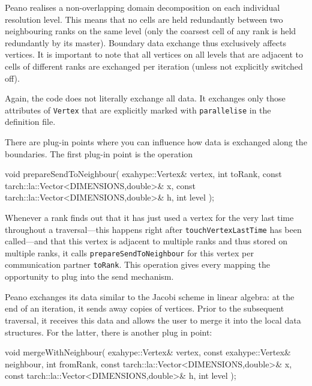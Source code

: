 Peano realises a non-overlapping domain decomposition on each individual
resolution level.
This means that no cells are held redundantly between two neighbouring ranks on
the same level (only the coarsest cell of any rank is held redundantly by its
master).
Boundary data exchange thus exclusively affects vertices. 
It is important to note that all vertices on all levels that are adjacent to
cells of different ranks are exchanged per iteration (unless not explicitly
switched off).

Again, the code does not literally exchange all data. 
It exchanges only those attributes of \texttt{Vertex} that are explicitly marked
with \texttt{parallelise} in the definition file.  

There are plug-in points where you can influence how data is exchanged along the
boundaries. The first plug-in point is the operation 

\begin{code}
void prepareSendToNeighbour(
  exahype::Vertex&                             vertex,
  int                                          toRank,
  const tarch::la::Vector<DIMENSIONS,double>&  x,
  const tarch::la::Vector<DIMENSIONS,double>&  h,
  int                                          level
);
\end{code}

\noindent
Whenever a rank finds out that it has just used a vertex for the very last time
throughout a traversal---this happens right after \texttt{touchVertexLastTime}
has been called---and that this vertex is adjacent to multiple ranks and thus
stored on multiple ranks, it calls \texttt{prepareSendToNeighbour} for this
vertex per communication partner \texttt{toRank}.
This operation gives every mapping the opportunity to plug into the send
mechanism.

Peano exchanges its data similar to the Jacobi scheme in linear algebra: 
at the end of an iteration, it sends away copies of vertices. 
Prior to the subsequent traversal, it receives this data and allows the user to
merge it into the local data structures.
For the latter, there is another plug in point:
\begin{code}
void mergeWithNeighbour(
  exahype::Vertex&                              vertex,
  const exahype::Vertex&                        neighbour,
  int                                           fromRank,
  const tarch::la::Vector<DIMENSIONS,double>&   x,
  const tarch::la::Vector<DIMENSIONS,double>&   h,
  int                                           level
);
\end{code}

